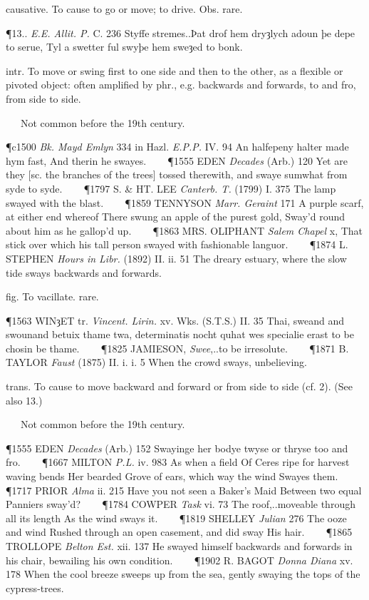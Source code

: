 \begin{description}[wide, labelwidth=!, labelindent=0pt]
\begin{myenumerate}
 causative. To cause to go or move; to drive. Obs. rare.

\P 13..  \textit{E.E. Allit. P.} C. 236 Styffe stremes..Þat drof hem dryȝlych adoun þe depe to serue, Tyl a swetter ful swyþe hem sweȝed to bonk.

 intr. To move or swing first to one side and then to the other, as a flexible or pivoted object: often amplified by phr., e.g. backwards and forwards, to and fro, from side to side.

   Not common before the 19th century.

\P c1500  \textit{Bk. Mayd Emlyn} 334 in Hazl. \textit{E.P.P.} IV. 94 An halfepeny halter made hym fast, And therin he swayes.    
\P 1555 EDEN  \textit{Decades} (Arb.) 120 Yet are they [sc. the branches of the trees] tossed therewith, and swaye sumwhat from syde to syde.    
\P 1797 S. \& HT.  LEE \textit{Canterb. T.} (1799) I. 375 The lamp swayed with the blast.    
\P 1859 TENNYSON  \textit{Marr. Geraint} 171 A purple scarf, at either end whereof There swung an apple of the purest gold, Sway'd round about him as he gallop'd up.    
\P 1863 MRS. OLIPHANT  \textit{Salem Chapel} x, That stick over which his tall person swayed with fashionable languor.    
\P 1874 L. STEPHEN \textit{Hours in  Libr.} (1892) II. ii. 51 The dreary estuary, where the slow tide sways backwards and forwards.

 fig. To vacillate. rare.

\P 1563 WINȝET tr.  \textit{Vincent. Lirin.} xv. Wks. (S.T.S.) II. 35 Thai, sweand and swounand betuix thame twa, determinatis nocht quhat wes specialie erast to be chosin be thame.    
\P 1825 JAMIESON,  \textit{Swee},..to be irresolute.    
\P 1871 B. TAYLOR  \textit{Faust} (1875) II. i. i. 5 When the crowd sways, unbelieving.

 trans. To cause to move backward and forward or from side to side (cf. 2). (See also 13.)

   Not common before the 19th century.

\P 1555 EDEN  \textit{Decades} (Arb.) 152 Swayinge her bodye twyse or thryse too and fro.    
\P 1667 MILTON  \textit{P.L.} iv. 983 As when a field Of Ceres ripe for harvest waving bends Her bearded Grove of ears, which way the wind Swayes them.    
\P 1717 PRIOR  \textit{Alma} ii. 215 Have you not seen a Baker's Maid Between two equal Panniers sway'd?    
\P 1784 COWPER  \textit{Task} vi. 73 The roof,..moveable through all its length As the wind sways it.    
\P 1819 SHELLEY  \textit{Julian} 276 The ooze and wind Rushed through an open casement, and did sway His hair.    
\P 1865 TROLLOPE  \textit{Belton Est.} xii. 137 He swayed himself backwards and forwards in his chair, bewailing his own condition.    
\P 1902 R. BAGOT  \textit{Donna Diana} xv. 178 When the cool breeze sweeps up from the sea, gently swaying the tops of the cypress-trees.


\end{myenumerate}
\end{description}
